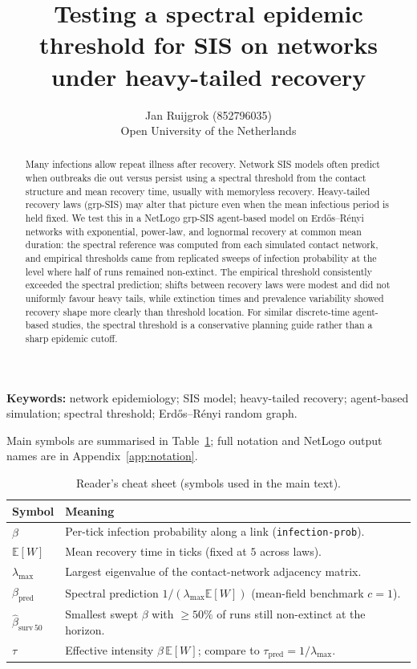 \documentclass[11pt,a4paper]{article}
\title{Testing a spectral epidemic threshold for SIS on networks under heavy-tailed recovery}
\author{Jan Ruijgrok (852796035)\\
  Open University of the Netherlands}
\date{\RepReportDate}
\begin{document}
\maketitle

\begin{abstract}
Many infections allow repeat illness after recovery. Network SIS models often predict when outbreaks die out versus persist using a spectral threshold from the contact structure and mean recovery time, usually with memoryless recovery. Heavy-tailed recovery laws (grp-SIS) may alter that picture even when the mean infectious period is held fixed. We test this in a NetLogo grp-SIS agent-based model on Erd\H{o}s--R\'enyi networks with exponential, power-law, and lognormal recovery at common mean duration: the spectral reference was computed from each simulated contact network, and empirical thresholds came from replicated sweeps of infection probability at the level where half of runs remained non-extinct. The empirical threshold consistently exceeded the spectral prediction; shifts between recovery laws were modest and did not uniformly favour heavy tails, while extinction times and prevalence variability showed recovery shape more clearly than threshold location. For similar discrete-time agent-based studies, the spectral threshold is a conservative planning guide rather than a sharp epidemic cutoff.
\end{abstract}

\noindent\textbf{Keywords:} network epidemiology; SIS model; heavy-tailed recovery; agent-based simulation; spectral threshold; Erd\H{o}s--R\'enyi random graph.

\noindent Main symbols are summarised in Table~\ref{tab:notation-cheatsheet}; full notation and NetLogo output names are in Appendix~\ref{app:notation}.

\begin{table}[t]
  \centering
  \small
  \caption{Reader's cheat sheet (symbols used in the main text).}
  \label{tab:notation-cheatsheet}
  \begin{tabular}{@{}ll@{}}
    \toprule
    \textbf{Symbol} & \textbf{Meaning} \\
    \midrule
    $\beta$ & Per-tick infection probability along a link (\texttt{infection-prob}). \\
    $\mathbb{E}[W]$ & Mean recovery time in ticks (fixed at $5$ across laws). \\
    $\lambda_{\max}$ & Largest eigenvalue of the contact-network adjacency matrix. \\
    $\beta_{\mathrm{pred}}$ & Spectral prediction $1/(\lambda_{\max}\mathbb{E}[W])$ (mean-field benchmark $c{=}1$). \\
    $\hat{\beta}_{\mathrm{surv}\,50}$ & Smallest swept $\beta$ with $\ge 50\%$ of runs still non-extinct at the horizon. \\
    $\tau$ & Effective intensity $\beta\,\mathbb{E}[W]$; compare to $\tau_{\mathrm{pred}}=1/\lambda_{\max}$. \\
    \bottomrule
  \end{tabular}
\end{table}
\end{document}
